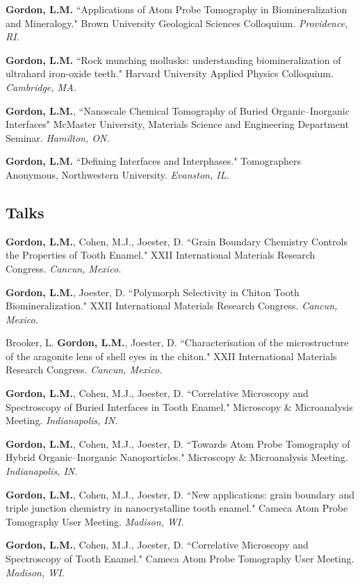 \textbf{Gordon, L.M.} ``Applications of Atom Probe Tomography in Biomineralization and Mineralogy." Brown University Geological Sciences Colloquium. \emph{Providence, RI.}

\textbf{Gordon, L.M.} ``Rock munching mollusks: understanding biomineralization of ultrahard iron-oxide teeth." Harvard University Applied Physics Colloquium. \emph{Cambridge, MA.}

\textbf{Gordon, L.M.}, ``Nanoscale Chemical Tomography of Buried Organic--Inorganic Interfaces" McMaster University, Materials Science and Engineering Department Seminar. \emph{Hamilton, ON.}

\textbf{Gordon, L.M.} ``Defining Interfaces and Interphases." Tomographers Anonymous, Northwestern University. \emph{Evanston, IL.}

\subsection*{Talks}
\textbf{Gordon, L.M.}, Cohen, M.J., Joester, D. ``Grain Boundary Chemistry Controls the Properties of Tooth Enamel." XXII International Materials Research Congress. \emph{Cancun, Mexico.}
\begingroup\setlength{\parskip}{0.15cm}

\textbf{Gordon, L.M.}, Joester, D. ``Polymorph Selectivity in Chiton Tooth Biomineralization." XXII International Materials Research Congress. \emph{Cancun, Mexico.}

Brooker, L. \textbf{Gordon, L.M.}, Joester, D. ``Characterisation of the microstructure of the aragonite lens of shell eyes in the chiton." XXII International Materials Research Congress. \emph{Cancun, Mexico.}

\textbf{Gordon, L.M.}, Cohen, M.J., Joester, D. ``Correlative Microscopy and Spectroscopy of Buried Interfaces in Tooth Enamel." Microscopy \& Microanalysis Meeting. \emph{Indianapolis, IN.}

\textbf{Gordon, L.M.}, Cohen, M.J., Joester, D. ``Towards Atom Probe Tomography of Hybrid Organic--Inorganic Nanoparticles." Microscopy \& Microanalysis Meeting. \emph{Indianapolis, IN.}

\textbf{Gordon, L.M.}, Cohen, M.J., Joester, D. ``New applications: grain boundary and triple junction chemistry in nanocrystalline tooth enamel." Cameca Atom Probe Tomography User Meeting. \emph{Madison, WI.}

\textbf{Gordon, L.M.}, Cohen, M.J., Joester, D. ``Correlative Microscopy and Spectroscopy of Tooth Enamel." Cameca Atom Probe Tomography User Meeting. \emph{Madison, WI.}

